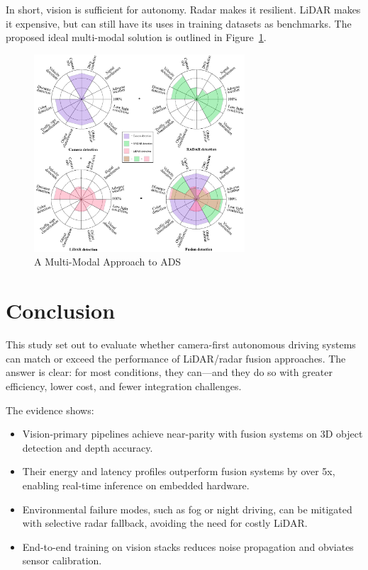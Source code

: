\documentclass[12pt]{article}
\begin{document}
In short, vision is sufficient for autonomy. Radar makes it resilient. LiDAR
makes it expensive, but can still have its uses in training datasets as
benchmarks. The proposed ideal multi-modal solution is outlined in
Figure~\ref{fig:multimodal}.
\begin{figure}[H]
	\centering
	\includegraphics[width=0.7\textwidth]{multimodal}
	\caption{A Multi-Modal Approach to ADS \autocite{Hasanujjaman2023}}
	\label{fig:multimodal}
\end{figure}
\section{Conclusion}

This study set out to evaluate whether camera-first autonomous driving systems can match or exceed the performance of LiDAR/radar fusion approaches. The answer is clear: for most conditions, they can—and they do so with greater efficiency, lower cost, and fewer integration challenges.

The evidence shows:

\begin{itemize}
  \item Vision-primary pipelines achieve near-parity with fusion systems on 3D object detection and depth accuracy.
  \item Their energy and latency profiles outperform fusion systems by over 5x, enabling real-time inference on embedded hardware.
  \item Environmental failure modes, such as fog or night driving, can be mitigated with selective radar fallback, avoiding the need for costly LiDAR.
  \item End-to-end training on vision stacks reduces noise propagation and obviates sensor calibration.
\end{itemize}
\end{document}
